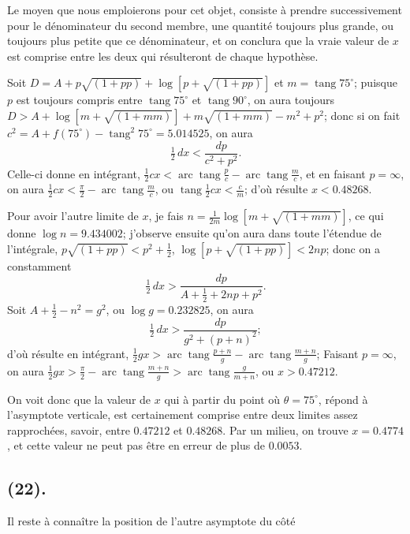 \documentclass{article}
\begin{document}

Le moyen que nous emploierons pour cet objet, consiste à prendre successivement pour le dénominateur du second membre, une quantité toujours plus grande, ou toujours plus petite que ce dénominateur, et on conclura que la vraie valeur de $x$ est comprise entre les deux qui résulteront de chaque hypothèse.

Soit $D=A+p\sqrt{(1+pp)}+\log[p+\sqrt{(1+pp)}]$ et $m=\operatorname{tang}75^{\circ}$; puisque $p$ est toujours compris entre $\operatorname{tang}75^{\circ}$ et $\operatorname{tang}90^{\circ}$, on aura toujours $D>A+\log[m+\sqrt{(1+mm)}]+m\sqrt{(1+mm)}-m^{2}+p^{2}$; donc si on fait $c^{2}=A+f(75^{\circ})-\operatorname{tang}^{2}75^{\circ}=5.014525$, on aura
\[ \tfrac{1}{2}\,dx<\frac{dp}{c^{2}+p^{2}}. \]
Celle-ci donne en intégrant, $\frac{1}{2}cx<\operatorname{arc}\operatorname{tang}\frac{p}{c}-\operatorname{arc}\operatorname{tang}\frac{m}{c}$, et en faisant $p=\infty$, on aura $\frac{1}{2}cx<\frac{\pi}{2}-\operatorname{arc}\operatorname{tang}\frac{m}{c}$, ou $\operatorname{tang}\frac{1}{2}cx<\frac{c}{m}$; d'où résulte $x<0.48268$.

Pour avoir l'autre limite de $x$, je fais $n=\frac{1}{2m}\log[m+\sqrt{(1+mm)}]$, ce qui donne $\log n=9.434002$; j'observe ensuite qu'on aura dans toute l'étendue de l'intégrale, $p\sqrt{(1+pp)}<p^{2}+\frac{1}{2}$, $\log[p+\sqrt{(1+pp)}]<2np$; donc on a constamment
\[ \tfrac{1}{2}\,dx>\frac{dp}{A+\frac{1}{2}+2np+p^{2}}. \]
Soit $A+\frac{1}{2}-n^{2}=g^{2}$, ou $\log g=0.232825$, on aura
\[ \tfrac{1}{2}\,dx>\frac{dp}{g^{2}+(p+n)^{2}}; \]
d'où résulte en intégrant, $\frac{1}{2}gx>\operatorname{arc}\operatorname{tang}\frac{p+n}{g}-\operatorname{arc}\operatorname{tang}\frac{m+n}{g}$; Faisant $p=\infty$, on aura $\frac{1}{2}gx>\frac{\pi}{2}-\operatorname{arc}\operatorname{tang}\frac{m+n}{g}>\operatorname{arc}\operatorname{tang}\frac{g}{m+n}$, ou $x>0.47212$.

On voit donc que la valeur de $x$ qui à partir du point où $\theta=75^{\circ}$, répond à l'asymptote verticale, est certainement comprise entre deux limites assez rapprochées, savoir, entre $0.47212$ et $0.48268$. Par un milieu, on trouve $x=0.4774$, et cette valeur ne peut pas être en erreur de plus de $0.0053$.

\subsection*{(22).}

Il reste à connaître la position de l'autre asymptote du côté
\end{document}
